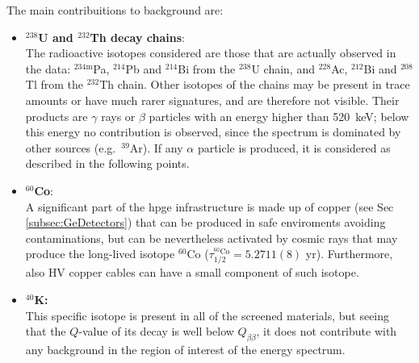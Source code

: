 The main contribuitions to background are:
\begin{itemize}
    \item \textbf{${}^{238}$U and ${}^{232}$Th decay chains}:\\
            The radioactive isotopes considered are those that are actually observed in the data: $^{234\mathrm{m}}$Pa, $^{214}$Pb and $^{214}$Bi from the $^{238}$U chain, and $^{228}$Ac, $^{212}$Bi and $^{208}$Tl from the $^{232}$Th chain. Other isotopes of the chains may be present in trace amounts or have much rarer signatures, and are therefore not visible. Their products are $\gamma$ rays or $\beta$ particles with an energy higher than 520~keV; below this energy no contribution is observed, since the spectrum is dominated by other sources (e.g.\ $^{39}$Ar). If any $\alpha$ particle is produced, it is considered as described in the following points.
    \item \textbf{${}^{60}$Co}:\\
            A significant part of the \ac{hpge} infrastructure is made up of copper (see Sec \ref{subsec:GeDetectors}) that can be produced in safe enviroments avoiding contaminations, but can be nevertheless activated by cosmic rays that may produce the long-lived isotope ${}^{60}$Co ($\tau_{1/2}^{{}^{60}\text{Co}} = 5.2711(8)$ yr). Furthermore, also \ac{HV} copper cables can have a small component of such isotope.

    \item \textbf{${}^{40}$K:}\\
            This specific isotope is present in all of the screened materials, but seeing that the $Q$-value of its decay is well below $Q_{\beta\beta}$, it does not contribute with any background in the region of interest of the energy spectrum.


\end{itemize}
